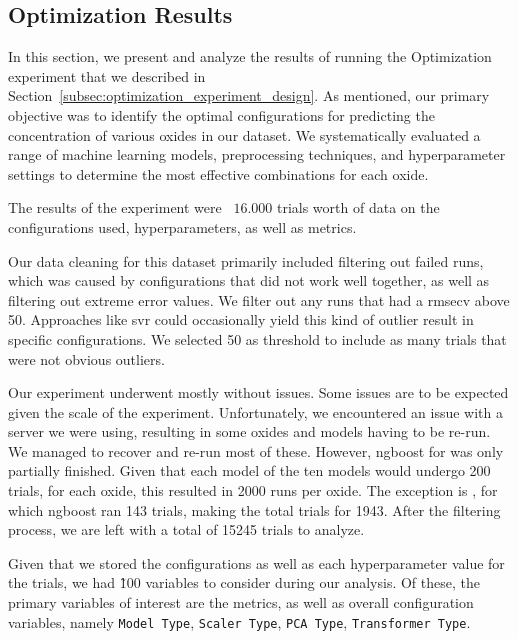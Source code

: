 \subsection{Optimization Results}\label{sec:optimization_results}
In this section, we present and analyze the results of running the Optimization experiment that we described in Section~\ref{subsec:optimization_experiment_design}.
As mentioned, our primary objective was to identify the optimal configurations for predicting the concentration of various oxides in our dataset.
We systematically evaluated a range of machine learning models, preprocessing techniques, and hyperparameter settings to determine the most effective combinations for each oxide.

The results of the experiment were ~$16.000$ trials worth of data on the configurations used, hyperparameters, as well as metrics.

Our data cleaning for this dataset primarily included filtering out failed runs, which was caused by configurations that did not work well together, as well as filtering out extreme error values.
We filter out any runs that had a \gls{rmsecv} above 50.
Approaches like \gls{svr} could occasionally yield this kind of outlier result in specific configurations.
We selected 50 as threshold to include as many trials that were not obvious outliers.

Our experiment underwent mostly without issues.
Some issues are to be expected given the scale of the experiment.
Unfortunately, we encountered an issue with a server we were using, resulting in some oxides and models having to be re-run.
We managed to recover and re-run most of these.
However, \gls{ngboost} for  was only partially finished.
Given that each model of the ten models would undergo 200 trials, for each oxide, this resulted in 2000 runs per oxide.
The exception is , for which \gls{ngboost} ran 143 trials, making the total trials for  1943.
After the filtering process, we are left with a total of 15245 trials to analyze.

Given that we stored the configurations as well as each hyperparameter value for the trials, we had \~100 variables to consider during our analysis.
Of these, the primary variables of interest are the metrics, as well as overall configuration variables, namely \texttt{Model Type}, \texttt{Scaler Type}, \texttt{PCA Type}, \texttt{Transformer Type}.


